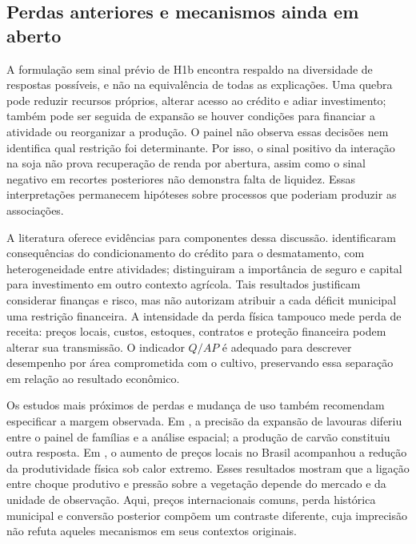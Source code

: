 \subsection{Perdas anteriores e mecanismos ainda em aberto}

A formulação sem sinal prévio de H1b encontra respaldo na diversidade de respostas possíveis, e não na equivalência de todas as explicações. Uma quebra pode reduzir recursos próprios, alterar acesso ao crédito e adiar investimento; também pode ser seguida de expansão se houver condições para financiar a atividade ou reorganizar a produção. O painel não observa essas decisões nem identifica qual restrição foi determinante. Por isso, o sinal positivo da interação na soja não prova recuperação de renda por abertura, assim como o sinal negativo em recortes posteriores não demonstra falta de liquidez. Essas interpretações permanecem hipóteses sobre processos que poderiam produzir as associações.

A literatura oferece evidências para componentes dessa discussão.  identificaram consequências do condicionamento do crédito para o desmatamento, com heterogeneidade entre atividades;  distinguiram a importância de seguro e capital para investimento em outro contexto agrícola. Tais resultados justificam considerar finanças e risco, mas não autorizam atribuir a cada déficit municipal uma restrição financeira. A intensidade da perda física tampouco mede perda de receita: preços locais, custos, estoques, contratos e proteção financeira podem alterar sua transmissão. O indicador $Q/AP$ é adequado para descrever desempenho por área comprometida com o cultivo, preservando essa separação em relação ao resultado econômico.

Os estudos mais próximos de perdas e mudança de uso também recomendam especificar a margem observada. Em , a precisão da expansão de lavouras diferiu entre o painel de famílias e a análise espacial; a produção de carvão constituiu outra resposta. Em , o aumento de preços locais no Brasil acompanhou a redução da produtividade física sob calor extremo. Esses resultados mostram que a ligação entre choque produtivo e pressão sobre a vegetação depende do mercado e da unidade de observação. Aqui, preços internacionais comuns, perda histórica municipal e conversão posterior compõem um contraste diferente, cuja imprecisão não refuta aqueles mecanismos em seus contextos originais.


